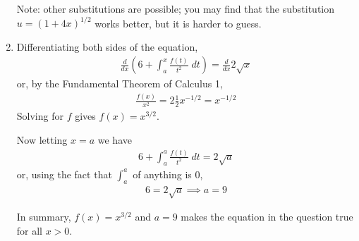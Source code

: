 \documentclass[12pt]{article}
\begin{document}
\begin{enumerate}
  Note: other substitutions are possible; you may find that the
  substitution $u=(1+4x)^{1/2}$ works better, but it is harder to 
  guess.
\item Differentiating both sides of the equation,
  \begin{align*}
    \frac{d}{dx} \left( 6 + \int_a^x \frac{f(t)}{t^2} \; dt \right)
    = \frac{d}{dx} 2\sqrt{x}
  \end{align*}
  or, by the Fundamental Theorem of Calculus 1,
  \begin{align*}
    \frac{f(x)}{x^2} = 2 \frac{1}{2} x^{-1/2} = x^{-1/2}
  \end{align*}
  Solving for $f$ gives $f(x) = x^{3/2}$.

  Now letting $x=a$ we have
  \begin{align*}
    6 + \int_a^a \frac{f(t)}{t^2} \; dt = 2\sqrt{a}
  \end{align*}
  or, using the fact that $\int_a^a$ of anything is $0$,
  \begin{align*}
    6 = 2\sqrt{a} \implies a=9
  \end{align*}
  
  In summary, $f(x)=x^{3/2}$ and $a=9$ makes the equation in the 
  question true for all $x>0$.
\end{enumerate}
\end{document}
